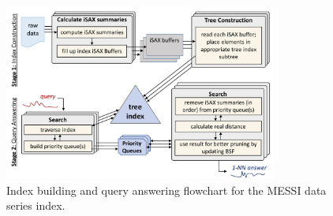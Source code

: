 \begin{figure}[htbp]
    \centering
    \includegraphics[width=0.8\textwidth]{figures/prelem/flowchart2.pdf}
    \caption{Index building and query answering flowchart for the MESSI data series index.}
    \label{fig:example2}
    \vspace{-0.5cm} %
\end{figure}


